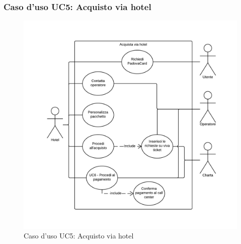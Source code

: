\subsubsection{Caso d'uso UC5: Acquisto via hotel}
\begin{figure}[H]
\centering
\includegraphics[width=1\textwidth]{images/UC5.png}
\caption{Caso d'uso UC5: Acquisto via hotel}
\end{figure}
